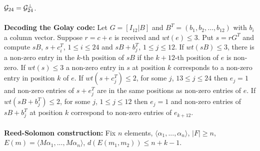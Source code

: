 ${\cal G}_{24} = {\cal G}_{24}^{\perp}$.
\\
\\
{\bf Decoding the Golay code:} Let
$G=[I_{12} | B]$ and $B^T= (b_1 , b_2 , \ldots, b_{12})$ with $b_i$ a column vector.
Suppose $r=c+e$ is received and $wt(e) \le 3$.  Put $s= rG^T$ and compute
$sB$, $s+c_i^T$, $1 \le i \le 24$ and $sB+b_j^T$, $1 \le j \le 12$. If
$wt(sB) \le 3$, there is a non-zero entry in the $k$-th position of $sB$ if
the $k+12$-th position of $e$ is non-zero.   If $wt(s) \le 3$ a non-zero entry in
$s$ at position $k$ corresponds to a non-zero entry in position $k$ of $e$.  
If $wt(s+c_j^T) \le 2$, for some $j$, $13 \le j \le 24$ then $e_j=1$ and non-zero
entries of $s+e_j^T$ are in the same positions as non-zero entries of $e$.
If $wt(sB+b_j^T) \le 2$, for some $j$, $1 \le j \le 12$ then $e_j=1$ and non-zero
entries of $sB+b_j^T$ at position $k$ correspond to non-zero entries of $e_{k+12}$.
\\
\\
{\bf Reed-Solomon construction:} 
Fix $n$ elements, $\langle \alpha_1 , ..., \alpha_n \rangle$, 
$|F| \geq n$, $E(m)= \langle M\alpha_1 , ..., M\alpha_n \rangle$, $d(E(m_1,m_2)) \leq n+k-1$.
